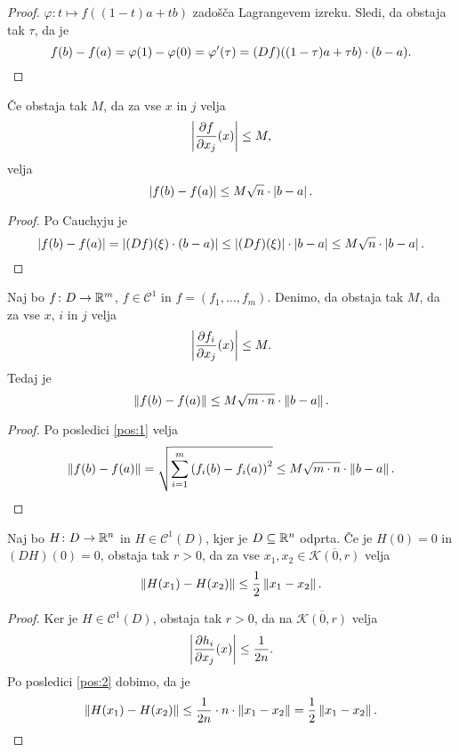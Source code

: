 \begin{proof}
$\varphi \colon t \mapsto f((1-t)a + tb)$ zadošča Lagrangevem
izreku. Sledi, da obstaja tak $\tau$, da je
\[
f(b) - f(a) =
\varphi(1) - \varphi(0) =
\varphi'(\tau) =
(Df)((1-\tau)a + \tau b) \cdot (b - a). \qedhere
\]
\end{proof}

\begin{posledica}\label{pos:1}
Če obstaja tak $M$, da za vse $x$ in $j$ velja
\[
\left\lvert \frac{\partial f}{\partial x_j}(x)\right\rvert \leq M,
\]
velja
\[
\left\lvert f(b) - f(a)\right\rvert \leq M \sqrt{n} \cdot \left\lvert b - a\right\rvert.
\]
\end{posledica}

\begin{proof}
Po Cauchyju je
\[
\left\lvert f(b) - f(a)\right\rvert =
\left\lvert (Df)(\xi) \cdot (b - a)\right\rvert \leq
\left\lvert (Df)(\xi)\right\rvert \cdot \left\lvert b - a\right\rvert \leq
M \sqrt{n} \cdot \left\lvert b - a\right\rvert. \qedhere
\]
\end{proof}

\begin{posledica}\label{pos:2}
Naj bo $f \colon D \to \mathbb{R}^m$, $f \in \mathcal{C}^1$ in
$f = (f_1, \dots, f_m)$. Denimo, da obstaja tak $M$, da za vse $x$,
$i$ in $j$ velja
\[
\left\lvert \frac{\partial f_i}{\partial x_j}(x)\right\rvert \leq M.
\]
Tedaj je
\[
\left\lVert f(b) - f(a)\right\rVert \leq M \sqrt{m \cdot n} \cdot \left\lVert b - a\right\rVert.
\]
\end{posledica}

\begin{proof}
Po posledici \ref{pos:1} velja
\[
\left\lVert f(b) - f(a)\right\rVert =
\sqrt{\sum_{i=1}^m \left(f_i(b) - f_i(a)\right)^2} \leq
M \sqrt{m \cdot n} \cdot \left\lVert b - a\right\rVert. \qedhere
\]
\end{proof}

\begin{lema}\label{lm:1}
Naj bo $H \colon D \to \mathbb{R}^n$ in $H \in \mathcal{C}^1(D)$, kjer je
$D \subseteq \mathbb{R}^n$ odprta. Če je $H(0)=0$ in $(DH)(0)=0$, obstaja
tak $r>0$, da za vse $x_1, x_2 \in \overline{\mathcal{K}(0,r)}$
velja
\[
\left\lVert H(x_1) - H(x_2)\right\rVert \leq \frac{1}{2} \left\lVert x_1 - x_2\right\rVert.
\]
\end{lema}

\begin{proof}
Ker je $H \in \mathcal{C}^1(D)$, obstaja tak $r > 0$, da na
$\overline{\mathcal{K}(0,r)}$ velja
\[
\left\lvert \frac{\partial h_i}{\partial x_j}(x)\right\rvert \leq \frac{1}{2n}.
\]
Po posledici \ref{pos:2} dobimo, da je
\[
\left\lVert H(x_1) - H(x_2)\right\rVert \leq
\frac{1}{2n} \cdot n \cdot \left\lVert x_1 - x_2\right\rVert =
\frac{1}{2} \left\lVert x_1 - x_2\right\rVert. \qedhere
\]
\end{proof}


